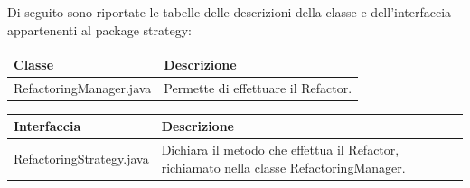 \documentclass[11pt]{article}
\begin{document}
\begin{description}
\begin{figure}[!h]
				\end{figure}
				Di seguito sono riportate le tabelle delle descrizioni della classe e dell'interfaccia appartenenti al package strategy:
				\item \begin{tabular}{|p{}|p{}|}
					\hline
					\textbf{Classe} & \textbf{Descrizione}\\
					\hline
					RefactoringManager.java & Permette di effettuare il Refactor.  \\
					\hline
				\end{tabular}
				\item \begin{tabular}{|p{}|p{}|}
					\hline
					\textbf{Interfaccia} & \textbf{Descrizione}\\
					\hline
					RefactoringStrategy.java & Dichiara il metodo che effettua il Refactor, richiamato nella classe RefactoringManager. \\
					\hline
				\end{tabular}
				
			\end{description}
			
\end{document}
